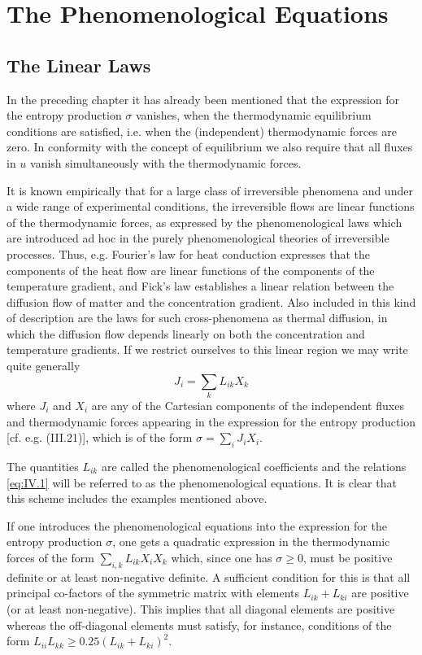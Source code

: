 \chapter{The Phenomenological Equations}

\section{The Linear Laws}
In the preceding chapter it has already been mentioned that the expression for the entropy production $\sigma$ vanishes, when the thermodynamic equilibrium conditions are satisfied, i.e. when the (independent) thermodynamic forces are zero. In conformity with the concept of equilibrium we also require that all fluxes in $u$ vanish simultaneously with the thermodynamic forces.

It is known empirically that for a large class of irreversible phenomena and under a wide range of experimental conditions, the irreversible flows are linear functions of the thermodynamic forces, as expressed by the phenomenological laws which are introduced ad hoc in the purely phenomenological theories of irreversible processes. Thus, e.g. Fourier's law for heat conduction expresses that the components of the heat flow are linear functions of the components of the temperature gradient, and Fick's law establishes a linear relation between the diffusion flow of matter and the concentration gradient. Also included in this kind of description are the laws for such cross-phenomena as thermal diffusion, in which the diffusion flow depends linearly on both the concentration and temperature gradients. If we restrict ourselves to this linear region we may write quite generally 
\begin{equation}
J_i = \sum_k L_{ik} X_k
    \label{eq:IV.1}
\end{equation}
where $J_i$ and $X_i$ are any of the Cartesian components of the independent fluxes and thermodynamic forces appearing in the expression for the entropy production [cf. e.g. (III.21)], which is of the form $\sigma = \sum_i J_iX_i$.

The quantities $L_{ik}$ are called the phenomenological coefficients and the relations \eqref{eq:IV.1} will be referred to as the phenomenological equations. It is clear that this scheme includes the examples mentioned above.

If one introduces the phenomenological equations into the expression for the entropy production $\sigma$, one gets a quadratic expression in the thermodynamic forces of the form $\sum_{i,k} L_{ik} X_i X_k$ which, since one has $\sigma \geq 0$, must be positive definite or at least non-negative definite. A sufficient condition for this is that all principal co-factors of the symmetric matrix with elements $L_{ik} + L_{ki}$ are positive (or at least non-negative). This implies that all diagonal elements are positive whereas the off-diagonal elements must satisfy, for instance, conditions of the form $L_{ii}L_{kk} \geq 0.25 (L_{ik} + L_{ki})^2$.

